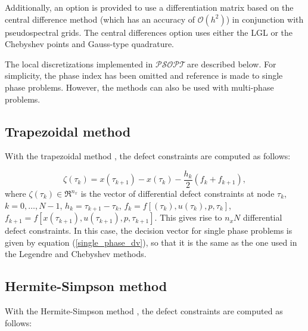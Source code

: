 \documentclass[a4paper,11pt]{report}    %
\newcommand{\psopt}{$\mathcal{PSOPT}$\,}  %
\begin{document}
Additionally, an option is provided to use a differentiation matrix based on the central difference method
 (which has an accuracy of $\mathcal{O}(h^2)$)  in conjunction with pseudospectral grids.
The central differences option uses either the LGL or the Chebyshev points and Gauss-type quadrature.


The  local  discretizations implemented in \psopt are described below.  
For simplicity, the phase index has been omitted  and reference is made to
single phase problems. However, the methods can also be used with multi-phase problems. 

\subsection{Trapezoidal method}




With the trapezoidal method \cite{Betts:01}, the defect constraints are computed as follows:

\begin{equation}
   \zeta(\tau_k) = x(\tau_{k+1}) - x(\tau_k) - \frac{h_k}{2}( f_k + f_{k+1}), 
\label{eq:TRP}
\end{equation}
where $\zeta(\tau_k) \in \Re^{n_x}$ is the vector of differential defect constraints at node $\tau_k$,  
$k=0,\ldots, N-1$, $h_k=\tau_{k+1}-\tau_k$,  
$f_k = f[(\tau_k), u(\tau_k), p, \tau_k]$, $f_{k+1} = f[x(\tau_{k+1}), u(\tau_{k+1}), p, \tau_{k+1}]$. 
This gives rise to $n_x N$ differential defect constraints. In this case, the decision vector for single
phase problems is given by equation (\ref{single_phase_dv}), so that it is the same as the one
used in the Legendre and Chebyshev methods. 



\subsection{Hermite-Simpson method}



With the Hermite-Simpson method \cite{Betts:01}, the defect constraints are computed as follows:
\end{document}
